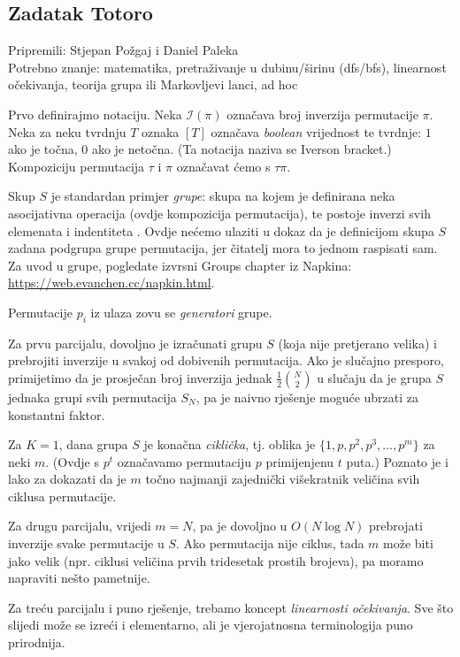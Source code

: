\newcommand\EE{\mathbb E}
\newcommand\PP{\mathbb P}
\newcommand\II{\mathcal I}

\subsection*{Zadatak Totoro}
\textsf{Pripremili: Stjepan Požgaj i Daniel Paleka}\\
\textsf{Potrebno znanje: matematika, pretraživanje u dubinu/širinu (dfs/bfs), 
linearnost očekivanja, teorija grupa ili Markovljevi lanci, ad hoc }

Prvo definirajmo notaciju.
Neka $\II(\pi)$ označava broj inverzija permutacije $\pi$.
Neka za neku tvrdnju $T$ oznaka $[T]$ označava \textit{boolean} vrijednost
te tvrdnje: $1$ ako je točna, $0$ ako je netočna. (Ta notacija naziva se 
Iverson bracket.) Kompoziciju permutacija $\tau$ i $\pi$ označavat ćemo s
$\tau \pi$.

Skup $S$ je standardan primjer \textit{grupe}: skupa na kojem je definirana
neka asocijativna operacija (ovdje kompozicija permutacija), te postoje
inverzi svih elemenata i indentiteta .
Ovdje nećemo ulaziti u dokaz da je definicijom skupa $S$ zadana podgrupa
grupe permutacija, jer čitatelj mora to jednom raspisati sam.
Za uvod u grupe, pogledate izvrsni Groups chapter iz Napkina:
\url{https://web.evanchen.cc/napkin.html}.

Permutacije $p_i$ iz ulaza zovu se \textit{generatori} grupe.

Za prvu parcijalu, dovoljno je izračunati grupu $S$ (koja nije 
pretjerano velika) i prebrojiti inverzije u svakoj
od dobivenih permutacija. Ako je slučajno presporo, 
primijetimo da je prosječan broj inverzija
jednak $\frac{1}{2} \binom{N}{2}$
u slučaju da je grupa $S$ jednaka grupi svih permutacija $S_N$,
pa je naivno rješenje moguće ubrzati za konstantni faktor.

Za $K = 1$, dana grupa $S$ je konačna \textit{ciklička}, 
tj. oblika je $\{ 1, p, p^2, p^3, \ldots, p^m \}$ za neki $m$.
(Ovdje s $p^t$ označavamo permutaciju $p$ primijenjenu $t$ puta.)
Poznato je i lako za dokazati da je $m$ točno najmanji
zajednički višekratnik veličina svih ciklusa permutacije.

Za drugu parcijalu, vrijedi $m = N$, pa je dovoljno u $O(N \log N)$
prebrojati inverzije svake permutacije u $S$. 
Ako permutacija nije ciklus, tada $m$ može biti jako velik
(npr. ciklusi veličina prvih tridesetak prostih brojeva), 
pa moramo napraviti nešto pametnije.

Za treću parcijalu i puno rješenje, trebamo koncept \textit{linearnosti
očekivanja}. Sve što slijedi može se izreći i elementarno,
ali je vjerojatnosna terminologija puno prirodnija.

